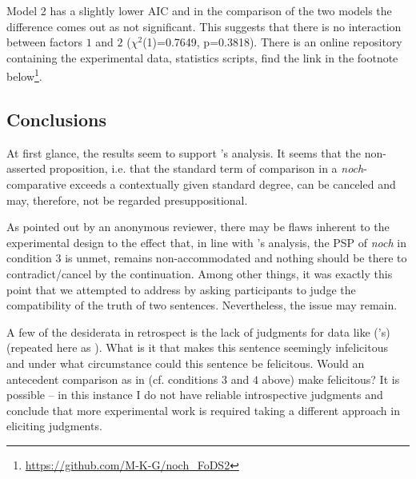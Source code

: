 \documentclass[output=paper,
modfonts
]{langscibook}
\begin{document}
Model 2 has a slightly lower AIC and in the comparison of the two models the difference comes out as not significant. This suggests that there is no interaction between factors $1$ and $2$ ($\chi^{2}$(1)=0.7649, p=0.3818). There is an online repository containing the experimental data, statistics scripts, find the link in the footnote below\footnote{\url{https://github.com/M-K-G/noch_FoDS2}}\citet{github_website}.

\subsection{Conclusions}
At first glance, the results seem to support \citeauthor{umbach2009a_comp}'s \citeyearpar{umbach2009a_comp} analysis. It seems that the non-asserted proposition, i.e. that the standard term of comparison in a \textit{noch}-comparative exceeds a contextually given standard degree, can be canceled and may, therefore, not be regarded presuppositional.

As pointed out by an anonymous reviewer, there may be flaws inherent to the experimental design to the effect that, in line with \citeauthor{Hofstetter2013}'s analysis, the PSP of \textit{noch} in condition $3$ is unmet, remains non-accommodated and nothing should be there to contradict/cancel by the continuation. Among other things, it was exactly this point that we attempted to address by asking participants to judge the compatibility of the truth of two sentences. Nevertheless, the issue may remain.

A few of the desiderata in retrospect is the lack of judgments for data like (\citeauthor{Hofstetter2013}'s)  (repeated here as ). What is it that makes this sentence seemingly infelicitous and under what circumstance could this sentence be felicitous. Would an antecedent comparison as in  (cf. conditions $3$ and $4$ above) make  felicitous? It is possible -- in this instance I do not have reliable introspective judgments and conclude that more experimental work is required taking a different approach in eliciting judgments. %
\end{document}
